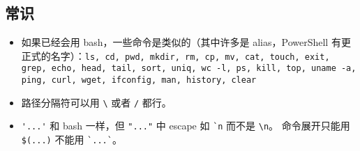 
\subsection{常识}
\begin{itemize}
\item 如果已经会用 bash，一些命令是类似的（其中许多是 alias，PowerShell 有更正式的名字）：\verb`ls, cd, pwd, mkdir, rm, cp, mv, cat, touch, exit, grep, echo, head, tail, sort, uniq, wc -l, ps, kill, top, uname -a, ping, curl, wget, ifconfig, man, history, clear`
\item 路径分隔符可以用 \verb`\` 或者 \verb`/` 都行。
\item \verb`'...'` 和 bash 一样，但 \verb`"..."` 中 escape 如 \verb|`n| 而不是 \verb`\n`。 命令展开只能用 \verb`$(...)` 不能用 \verb|`...`|。
\end{itemize}

